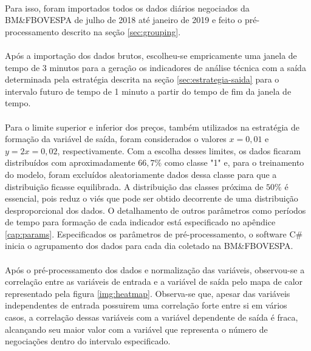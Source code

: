 \documentclass[grad,numbers]{coppe}
\begin{document}
            \paragraph{}Para isso, foram importados todos os dados diários negociados da BM\&FBOVESPA de julho de 2018 até janeiro de 2019 e feito o pré-processamento descrito na seção \ref{sec:grouping}.
            
            \paragraph{}Após a importação dos dados brutos, escolheu-se empricamente uma janela de tempo de 3 minutos para a geração os indicadores de análise técnica com a saída determinada pela estratégia descrita na seção \ref{sec:estrategia-saida} para o intervalo futuro de tempo de 1 minuto a partir do tempo de fim da janela de tempo. 
            
            \paragraph{}Para o limite superior e inferior dos preços, também utilizados na estratégia de formação da variável de saída, foram considerados o valores $x = 0,01$ e $y = 2x = 0,02$, respectivamente. Com a escolha desses limites, os dados ficaram distribuídos com aproximadamente $66,7\%$ como classe "1" e, para o treinamento do modelo, foram excluídos aleatoriamente dados dessa classe para que a distribuição ficasse equilibrada. A distribuição das classes próxima de $50\%$ é essencial, pois reduz o viés que pode ser obtido decorrente de uma distribuição desproporcional dos dados. O detalhamento de outros parâmetros como períodos de tempo para formação de cada indicador está especificado no apêndice \ref{cap:params}. Especificados os parâmetros de pré-processamento, o software C\# inicia o agrupamento dos dados para cada dia coletado na BM\&FBOVESPA.
            
            \paragraph{}Após o pré-processamento dos dados e normalização das variáveis, observou-se a correlação entre as variáveis de entrada e a variável de saída pelo mapa de calor representado pela figura \ref{img:heatmap}. Observa-se que, apesar das variáveis independentes de entrada possuirem uma correlação forte entre si em vários casos, a correlação dessas variáveis com a variável dependente de saída é fraca, alcançando seu maior valor com a variável que representa o número de negociações dentro do intervalo especificado. 
            
\end{document}
